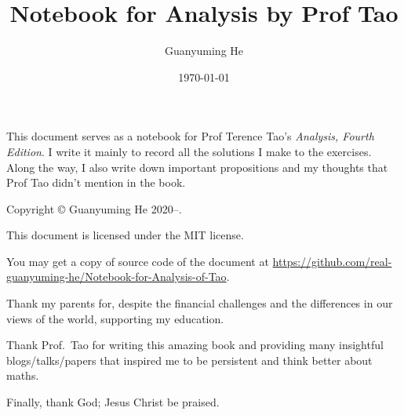 \documentclass[oneside]{book}
\author{Guanyuming He}
\title{Notebook for Analysis by Prof Tao}
\date{\today}
\begin{document}
\pagestyle{empty}
\maketitle

This document serves as a notebook for Prof Terence Tao's \emph{Analysis, Fourth Edition}. I write it mainly to record all the solutions I make to the exercises. Along the way, I also write down important propositions and my thoughts that Prof Tao didn't mention in the book.

\vfill

\begin{center}
Copyright \copyright{} Guanyuming He 2020--\the\year{}. 

This document is licensed under the MIT license.

You may get a copy of source code of the document at 
\url{https://github.com/real-guanyuming-he/Notebook-for-Analysis-of-Tao}.
\end{center}

\newpage
Thank my parents for, despite the financial challenges and the differences in our views of the world, supporting my education.

Thank Prof.~Tao for writing this amazing book and providing many insightful blogs/talks/papers that inspired me to be persistent and think better about maths.

Finally, thank God; Jesus Christ be praised.

\newpage
\pagestyle{headings}


\newpage
\tableofcontents


\newpage
{}
\pagestyle{headings}



\newpage


\newpage


\newpage
%

\newpage
%

\newpage
%

\newpage
%

\newpage
%

\newpage
%

%

%


%
\end{document}
